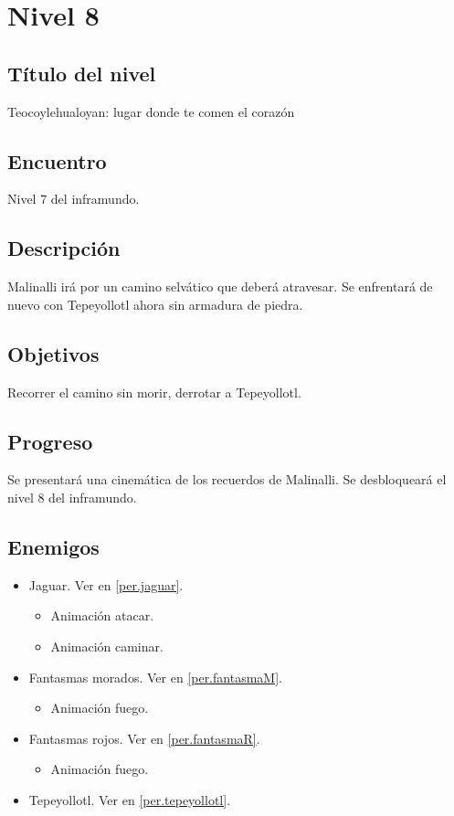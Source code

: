 	\section{Nivel 8}
	\subsection{Título del nivel}
	Teocoylehualoyan: lugar donde te comen el corazón
	\subsection{Encuentro}
	Nivel 7 del inframundo.
	\subsection{Descripción}
	Malinalli irá por un camino selvático que deberá atravesar. Se enfrentará de nuevo con Tepeyollotl ahora sin armadura de piedra.
	\subsection{Objetivos}
	Recorrer el camino sin morir, derrotar a Tepeyollotl.
	\subsection{Progreso}
	Se presentará una cinemática de los recuerdos de Malinalli. Se desbloqueará el nivel 8 del inframundo.
	\subsection{Enemigos}
	\begin{itemize}
		\item Jaguar. Ver en \ref{per.jaguar}.
			\begin{itemize}
				\item Animación atacar.
				\item Animación caminar.
			\end{itemize}
		\item Fantasmas morados. Ver en \ref{per.fantasmaM}.
			\begin{itemize}
				\item Animación fuego.
			\end{itemize}
		\item Fantasmas rojos. Ver en \ref{per.fantasmaR}.
			\begin{itemize}
				\item Animación fuego.
			\end{itemize}
		\item Tepeyollotl. Ver en \ref{per.tepeyollotl}.
	\end{itemize}
